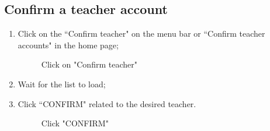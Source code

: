 \documentclass[ManualeUtente]{subfiles}
\begin{document}
\subsection{Confirm a teacher account}
\begin{enumerate}
	\item Click on the \textquotedblleft Confirm teacher" on the menu bar or \textquotedblleft Confirm teacher accounts" in the home page;
	\begin{figure}[H]
		\centering
		\caption{Click on "Confirm teacher"}
		\label{fig:Click on "Confirm teacher"}
	\end{figure}
	\item Wait for the list to load;
	\item Click \textquotedblleft CONFIRM" related to the desired teacher.
	\begin{figure}[H]
		\centering
		\caption{Click "CONFIRM"}
		\label{fig:Click "CONFIRM"}
	\end{figure}
\end{enumerate}
\end{document}

